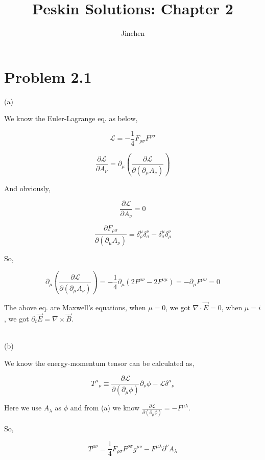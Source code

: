 \documentclass[11pt]{article} %
\title{Peskin Solutions: Chapter 2}
\author{Jinchen}
\begin{document}
\maketitle

\section{Problem 2.1}

\noindent (a)

We know the Euler-Lagrange eq. as below,

\[
    \mathcal{L} = - \frac{1}{4} \mathit{F}_{\rho \sigma} \mathit{F}^{\rho \sigma}
\]

\[
    \frac{\partial \mathcal{L}}{\partial A_{\nu}} = \partial_{\mu}( \frac{\partial \mathcal{L}}{\partial (\partial_{\mu} A_{\nu})} )    
\]

And obviously,

\[
    \frac{\partial \mathcal{L}}{\partial A_{\nu}} = 0
\]

\[
    \frac{\partial \mathit{F}_{\rho \sigma}}{\partial (\partial_{\mu} A_{\nu})} = \delta^{\mu}_{\rho} \delta^{\nu}_{\sigma} - \delta^{\mu}_{\sigma} \delta^{\nu}_{\rho}
\]

So,

\[
    \partial_{\mu}( \frac{\partial \mathcal{L}}{\partial (\partial_{\mu} A_{\nu})} ) = -\frac{1}{4} \partial_{\mu}( 2 \mathit{F}^{\mu \nu} - 2 \mathit{F}^{\nu \mu} ) = - \partial_{\mu} \mathit{F}^{\mu \nu} = 0
\]

The above eq. are Maxwell's equations, when $\mu = 0$, we got $\nabla \cdot \vec{E} = 0$, when $\mu = i$, we got $\partial_t \vec{E} = \nabla \times \vec{B}$.

~\\

\noindent (b)

We know the energy-momentum tensor can be calculated as,

\[
    T^{\mu}{ }_{\nu} \equiv \frac{\partial \mathcal{L}}{\partial\left(\partial_{\mu} \phi\right)} \partial_{\nu} \phi-\mathcal{L} \delta^{\mu}{ }_{\nu}    
\]

Here we use $A_{\lambda}$ as $\phi$ and from (a) we know $\frac{\partial \mathcal{L}}{\partial(\partial_{\mu} \phi)} = - \mathit{F}^{\mu \lambda}$.

So,

\[
    T^{\mu \nu} = \frac{1}{4}\mathit{F}_{\rho \sigma} \mathit{F}^{\rho \sigma} g^{\mu \nu} - \mathit{F}^{\mu \lambda} \partial^{\nu} A_{\lambda}
\]
\end{document}
